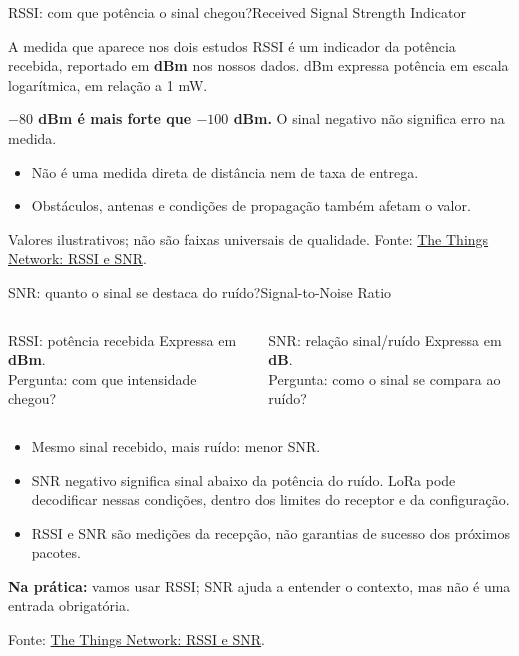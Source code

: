 \documentclass[aspectratio=169,10pt]{beamer}
\begin{document}
\begin{frame}{RSSI: com que potência o sinal chegou?}{Received Signal Strength Indicator}
\begin{block}{A medida que aparece nos dois estudos}
RSSI é um indicador da potência recebida, reportado em \textbf{dBm} nos nossos dados.
dBm expressa potência em escala logarítmica, em relação a 1 mW.
\end{block}
\centering
{}
\par\vspace{6mm}
\raggedright
\textbf{$-80$ dBm é mais forte que $-100$ dBm.} O sinal negativo não significa erro na medida.
\begin{itemize}
\item Não é uma medida direta de distância nem de taxa de entrega.
\item Obstáculos, antenas e condições de propagação também afetam o valor.
\end{itemize}
\scriptsize Valores ilustrativos; não são faixas universais de qualidade.
Fonte: \href{https://www.thethingsnetwork.org/docs/lorawan/rssi-and-snr/}{The Things Network: RSSI e SNR}.
\end{frame}

\begin{frame}{SNR: quanto o sinal se destaca do ruído?}{Signal-to-Noise Ratio}
\begin{columns}[T]
\begin{block}{RSSI: potência recebida}
Expressa em \textbf{dBm}.\\[2mm]
Pergunta: com que intensidade chegou?
\end{block}
\begin{block}{SNR: relação sinal/ruído}
Expressa em \textbf{dB}.\\[2mm]
Pergunta: como o sinal se compara ao ruído?
\end{block}
\end{columns}
\vspace{2mm}
\begin{itemize}
\item Mesmo sinal recebido, mais ruído: menor SNR.
\item SNR negativo significa sinal abaixo da potência do ruído. LoRa pode decodificar nessas condições, dentro dos limites do receptor e da configuração.
\item RSSI e SNR são medições da recepção, não garantias de sucesso dos próximos pacotes.
\end{itemize}
\textbf{Na prática:} vamos usar RSSI; SNR ajuda a entender o contexto, mas não é uma entrada obrigatória.
\par\vspace{2mm}
\scriptsize Fonte: \href{https://www.thethingsnetwork.org/docs/lorawan/rssi-and-snr/}{The Things Network: RSSI e SNR}.
\end{frame}
\end{document}
